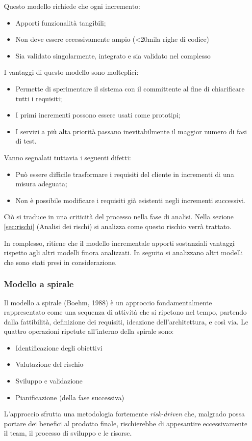 Questo modello richiede che ogni incremento:
\begin{itemize}
	\item Apporti funzionalità tangibili;
	\item Non deve essere eccessivamente ampio (<20mila righe di codice)
	\item Sia validato singolarmente, integrato e sia validato nel complesso
\end{itemize}

I vantaggi di questo modello sono molteplici:
\begin{itemize}
	\item Permette di sperimentare il sistema con il committente al fine di chiarificare tutti i requisiti;
	\item I primi incrementi possono essere usati come prototipi;
	\item I servizi a più alta priorità passano inevitabilmente il maggior numero di fasi di test.
\end{itemize}

Vanno segnalati tuttavia i seguenti difetti:
\begin{itemize}
\item Può essere difficile trasformare i requisiti del cliente in incrementi di una misura adeguata;
\item Non è possibile modificare i requisiti già esistenti negli incrementi successivi.
\end{itemize}
Ciò si traduce in una criticità del processo nella fase di analisi. Nella sezione {\ref{sec:rischi}} (Analisi dei rischi) si analizza come questo rischio verrà trattato.

In complesso, \hx{} ritiene che il modello incrementale apporti sostanziali vantaggi rispetto agli altri modelli finora analizzati. In seguito si analizzano altri modelli che sono stati presi in considerazione.

\subsubsection{Modello a spirale}
Il modello a spirale (Boehm, 1988) è un approccio fondamentalmente rappresentato come una sequenza di attività che si ripetono nel tempo, partendo dalla fattibilità, definizione dei requisiti, ideazione dell'architettura, e così via. Le quattro operazioni ripetute all'interno della spirale sono:
\begin{itemize}
	\item Identificazione degli obiettivi
	\item Valutazione del rischio
	\item Sviluppo e validazione
	\item Pianificazione (della fase successiva)
\end{itemize}			 

L'approccio sfrutta una metodologia fortemente \emph{risk-driven} che, malgrado possa portare dei benefici al prodotto finale, rischierebbe di appesantire eccessivamente il team, il processo di sviluppo e le risorse.




